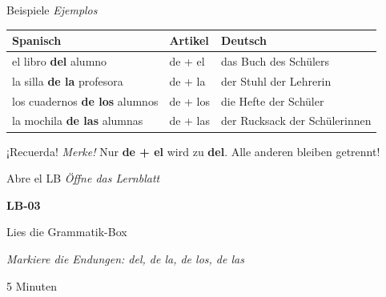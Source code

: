 \documentclass[aspectratio=169, 11pt]{beamer}
\newcommand{\seriftext}[1]{{\fontfamily{ppl}\selectfont #1}}
\newcommand{\es}[1]{\seriftext{\textbf{#1}}}
\newcommand{\de}[1]{\textit{\textcolor{mittelgrau}{#1}}}
\newcommand{\zeit}[1]{{\small\textcolor{mittelgrau}{#1}}}
\begin{document}
\begin{frame}{Beispiele \de{Ejemplos}}
    \vspace{0.5cm}

    \renewcommand{\arraystretch}{1.6}
    \begin{tabular}{lll}
        \toprule
        \textbf{Spanisch} & \textbf{Artikel} & \textbf{Deutsch} \\
        \midrule
        el libro \textcolor{akzent}{\textbf{del}} alumno & de + el & das Buch des Schülers \\
        la silla \textcolor{akzent}{\textbf{de la}} profesora & de + la & der Stuhl der Lehrerin \\
        los cuadernos \textcolor{akzent}{\textbf{de los}} alumnos & de + los & die Hefte der Schüler \\
        la mochila \textcolor{akzent}{\textbf{de las}} alumnas & de + las & der Rucksack der Schülerinnen \\
        \bottomrule
    \end{tabular}

    \vspace{0.8cm}

    \begin{block}{¡Recuerda! \de{Merke!}}
        Nur \textbf{de + el} wird zu \textbf{del}. Alle anderen bleiben getrennt!
    \end{block}
\end{frame}

\begin{frame}{Abre el LB \de{Öffne das Lernblatt}}
    \vspace{1cm}

    \begin{center}
        {\Huge\es{LB-03}}

        \vspace{0.8cm}

        {\large Lies die Grammatik-Box}

        \vspace{0.3cm}

        \de{Markiere die Endungen: del, de la, de los, de las}

        \vspace{1cm}

        \zeit{5 Minuten}
    \end{center}
\end{frame}

\end{document}
